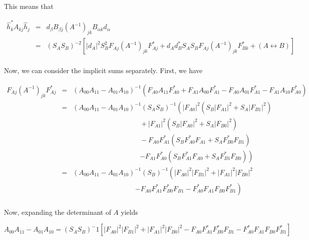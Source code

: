 \documentclass[10pt]{article}
\begin{document}
This means that

\begin{eqnarray}
\hat{h}_k^\ast A_{kj} \hat{h}_j & = & d_\beta B_{\beta j} \left(A^{-1}\right)_{jk} B_{\alpha k} d_\alpha \\
                                & = & (S_A S_B)^{-2} \left[ |d_A|^2 S_B^2 F_{Aj} \left(A^{-1}\right)_{jk} F_{Aj}^\ast + d_A d_B^\ast S_A S_B F_{Aj} \left(A^{-1}\right)_{jk} F_{Bk}^\ast + (A\leftrightarrow B)\right] \\
\end{eqnarray}

Now, we can consider the implicit sums separately. First, we have

\begin{eqnarray}
F_{Aj} \left(A^{-1}\right)_{jk} F_{Aj}^\ast & = & (A_{00}A_{11}-A_{01}A_{10})^{-1}\left( F_{A0}A_{11}F_{A0}^\ast + F_{A1}A_{00}F_{A1}^\ast - F_{A0}A_{01}F_{A1}^\ast - F_{A1}A_{10}F_{A0}^\ast \right) \\
& = & (A_{00}A_{11}-A_{01}A_{10})^{-1}(S_A S_B)^{-1}\left( |F_{A0}|^2(S_B|F_{A1}|^2 + S_A|F_{B1}|^2) \right.\\
&  & \ \ \ \ \ \ \ \ \ \ \ \ \ \ \ \ \ \ \ \ \ \ \ \ \ \ \ \ \ \ \ \ \ \ \ \ \ \ \ \ \ \ \ \ + |F_{A1}|^2(S_B|F_{A0}|^2 + S_A|F_{B0}|^2) \\
&  & \ \ \ \ \ \ \ \ \ \ \ \ \ \ \ \ \ \ \ \ \ \ \ \ \ \ \ \ \ \ \ \ \ \ \ \ \ \ \ \ \ \ \ \ - F_{A0}F_{A1}^\ast(S_B F_{A0}^\ast F_{A1} + S_A F_{B0}^\ast F_{B1}) \\
&  & \ \ \ \ \ \ \ \ \ \ \ \ \ \ \ \ \ \ \ \ \ \ \ \ \ \ \ \ \ \ \ \ \ \ \ \ \ \ \ \ \ \ \ \ \left. - F_{A1}F_{A0}^\ast(S_B F_{A1}^\ast F_{A0} + S_A F_{B1}^\ast F_{B0}) \right) \\
& = & (A_{00}A_{11}-A_{01}A_{10})^{-1}(S_B)^{-1}\left( |F_{A0}|^2|F_{B1}|^2 + |F_{A1}|^2|F_{B0}|^2 \right. \\
&   & \ \ \ \ \ \ \ \ \ \ \ \ \ \ \ \ \ \ \ \ \ \ \ \ \ \ \ \ \ \ \ \ \ \ \ \ \ \ \ \ \ \left. - F_{A0}F_{A1}^\ast F_{B0}^\ast F_{B1} - F_{A0}^\ast F_{A1} F_{B0} F_{B1}^\ast \right) \\
\end{eqnarray}

Now, expanding the determinant of $A$ yields

\begin{equation}
A_{00}A_{11}-A_{01}A_{10} = (S_A S_B)^-1 \left[ |F_{A0}|^2|F_{B1}|^2 + |F_{A1}|^2|F_{B0}|^2 - F_{A0}F_{A1}^\ast F_{B0}^\ast F_{B1} - F_{A0}^\ast F_{A1} F_{B0} F_{B1}^\ast \right]
\end{equation}
\end{document}
